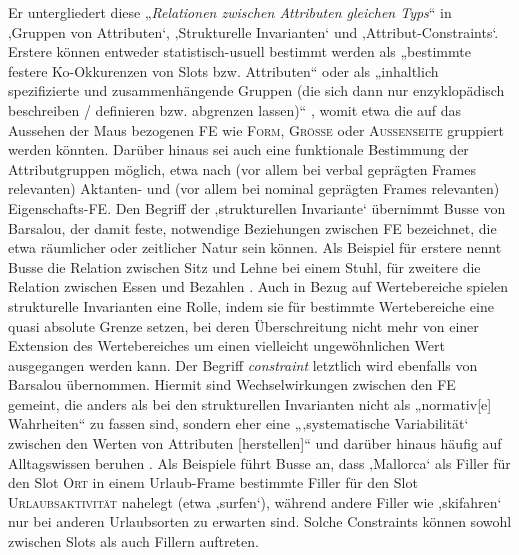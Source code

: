 Er untergliedert diese „\emph{Relationen zwischen Attributen gleichen Typs}`` in ‚Gruppen von Attributen`, ‚Strukturelle Invarianten` und ‚Attribut-Constraints`. Erstere können entweder statistisch-usuell bestimmt werden als „bestimmte festere Ko-Okkurenzen von Slots bzw. Attributen`` oder als „inhaltlich spezifizierte und zusammenhängende Gruppen (die sich dann nur enzyklopädisch beschreiben / definieren bzw. abgrenzen lassen)`` \autocite[594]{busseFrameSemantikKompendium2012}, womit etwa die auf das Aussehen der Maus bezogenen FE wie \textsc{Form}, \textsc{Größe} oder \textsc{Außenseite} gruppiert werden könnten. Darüber hinaus sei auch eine funktionale Bestimmung der Attributgruppen möglich, etwa nach (vor allem bei verbal geprägten Frames relevanten) Aktanten- und (vor allem bei nominal geprägten Frames relevanten) Eigenschafts-FE. Den Begriff der ‚strukturellen Invariante` übernimmt Busse von Barsalou, der damit feste, notwendige Beziehungen zwischen FE bezeichnet, die etwa räumlicher oder zeitlicher Natur sein können. Als Beispiel für erstere nennt Busse die Relation zwischen Sitz und Lehne bei einem Stuhl, für zweitere die Relation zwischen Essen und Bezahlen \autocite*[565]{busseFrameSemantikKompendium2012}. Auch in Bezug auf Wertebereiche spielen strukturelle Invarianten eine Rolle, indem sie für bestimmte Wertebereiche eine quasi absolute Grenze setzen, bei deren Überschreitung nicht mehr von einer Extension des Wertebereiches um einen vielleicht ungewöhnlichen Wert ausgegangen werden kann. Der Begriff \emph{constraint} letztlich wird ebenfalls von Barsalou übernommen. Hiermit sind Wechselwirkungen zwischen den FE gemeint, die anders als bei den strukturellen Invarianten nicht als „normativ{[}e{]} Wahrheiten`` zu fassen sind, sondern eher eine „‚systematische Variabilität` zwischen den Werten von Attributen {[}herstellen{]}`` und darüber hinaus häufig auf Alltagswissen beruhen \autocite[566]{busseFrameSemantikKompendium2012}. Als Beispiele führt Busse an, dass ‚Mallorca` als Filler für den Slot \textsc{Ort} in einem Urlaub-Frame bestimmte Filler für den Slot \textsc{Urlaubsaktivität} nahelegt (etwa ‚surfen`), während andere Filler wie ‚skifahren` nur bei anderen Urlaubsorten zu erwarten sind. Solche Constraints können sowohl zwischen Slots als auch Fillern auftreten.

